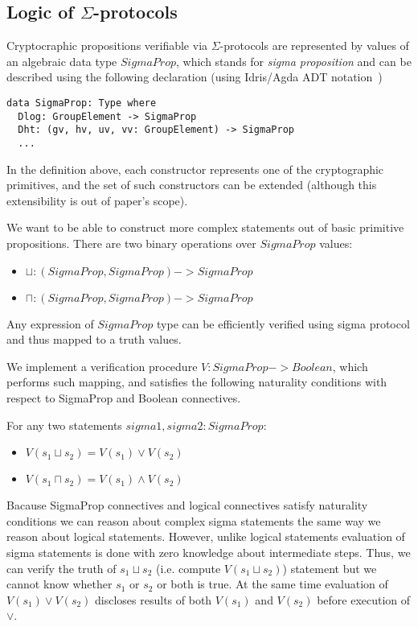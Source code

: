 \documentclass[11pt]{article}
\begin{document}
\subsection{Logic of $\Sigma$-protocols}

Cryptocraphic propositions verifiable via $\Sigma$-protocols are represented by values of an algebraic data type $SigmaProp$,
which stands for \emph{sigma proposition} and can be described using the following declaration (using Idris/Agda ADT notation~\cite{Idris, Agda})

\begin{lstlisting}
data SigmaProp: Type where
  Dlog: GroupElement -> SigmaProp
  Dht: (gv, hv, uv, vv: GroupElement) -> SigmaProp
  ...
\end{lstlisting}

In the definition above, each constructor represents one of the cryptographic primitives, and the set of such constructors
can be extended (although this extensibility is out of paper's scope).

We want to be able to construct more complex statements out of basic primitive propositions.
There are two binary operations over $SigmaProp$ values:
\begin{itemize}
\item $\sqcup: (SigmaProp, SigmaProp) -> SigmaProp$
\item $\sqcap: (SigmaProp, SigmaProp) -> SigmaProp$
\end{itemize}

Any expression of $SigmaProp$ type can be efficiently verified using sigma protocol and thus mapped to a truth values.

We implement a verification procedure $V: SigmaProp -> Boolean$, which performs such mapping, and satisfies the following
naturality conditions with respect to SigmaProp and Boolean connectives.

For any two statements $sigma1, sigma2: SigmaProp$:
\begin{itemize}
    \item $V(s_1 \sqcup s_2) = V(s_1) \lor V(s_2)$
    \item $V(s_1 \sqcap s_2) = V(s_1) \land V(s_2)$
\end{itemize}

Bacause SigmaProp connectives and logical connectives satisfy naturality conditions we can reason about complex sigma statements
the same way we reason about logical statements.
However, unlike logical statements evaluation of sigma statements is done with zero knowledge about intermediate steps.
Thus, we can verify the truth of $s_1 \sqcup s_2$ (i.e. compute $V(s_1 \sqcup s_2)$) statement but we cannot know whether $s_1$ or $s_2$ or both is true. At the same time evaluation of $V(s_1) \lor V(s_2)$ discloses results of both $V(s_1)$ and $V(s_2)$ before execution of $\lor$.
\end{document}
